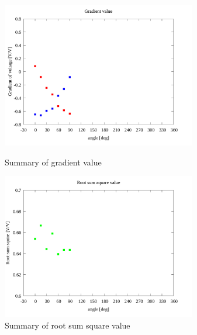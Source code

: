 \documentclass[twocolumn,a4j]{jsarticle}
\begin{document}
\begin{figure}[htbp]
    \footnotesize
    \begin{center}
        \includegraphics[width=85mm]{../images/summary/summary_1.png}
        \caption{Summary of gradient value}
        \includegraphics[width=85mm]{../images/summary/summary_2.png}
        \caption{Summary of root sum square value}
    \end{center}
\end{figure}
\end{document}
